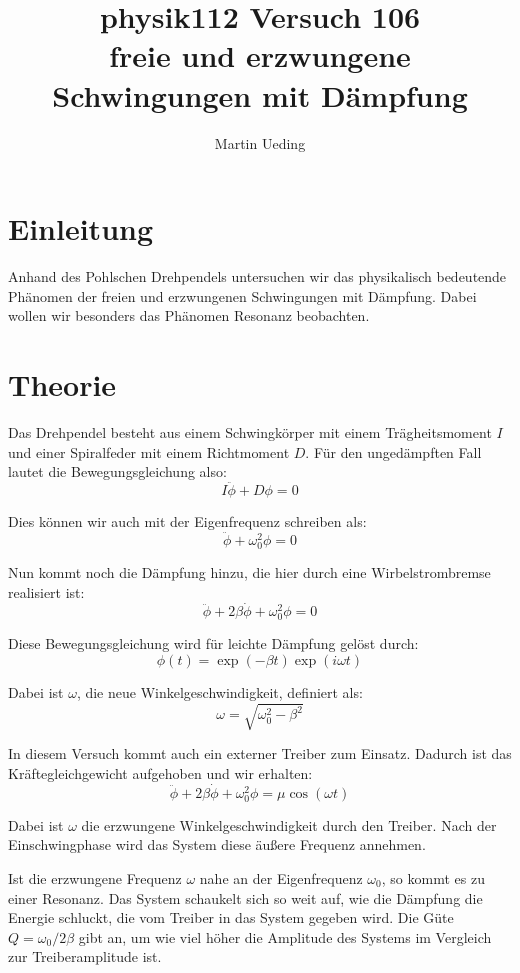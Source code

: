 \documentclass[11pt]{article}
\title{physik112 Versuch 106 \\ freie und erzwungene Schwingungen mit Dämpfung}
\author{Martin Ueding}
\begin{document}
\maketitle

\section{Einleitung}

Anhand des Pohlschen Drehpendels untersuchen wir das physikalisch bedeutende
Phänomen der freien und erzwungenen Schwingungen mit Dämpfung. Dabei wollen wir
besonders das Phänomen Resonanz beobachten.

\section{Theorie}

Das Drehpendel besteht aus einem Schwingkörper mit einem Trägheitsmoment $I$
und einer Spiralfeder mit einem Richtmoment $D$. Für den ungedämpften Fall
lautet die Bewegungsgleichung also:
\[ I \ddot{\phi} + D \phi = 0 \]

Dies können wir auch mit der Eigenfrequenz schreiben als:
\[ \ddot{\phi} + \omega_0^2 \phi = 0 \]

Nun kommt noch die Dämpfung hinzu, die hier durch eine Wirbelstrombremse
realisiert ist:
\[ \ddot{\phi} + 2 \beta \dot{\phi} + \omega_0^2 \phi = 0 \]

Diese Bewegungsgleichung wird für leichte Dämpfung gelöst durch:
\[ \phi(t) = \exp(-\beta t) \exp(i \omega t) \]

Dabei ist $\omega$, die neue Winkelgeschwindigkeit, definiert als:
\[ \omega = \sqrt{\omega_0^2 - \beta^2} \] 

In diesem Versuch kommt auch ein externer Treiber zum Einsatz. Dadurch ist das
Kräftegleichgewicht aufgehoben und wir erhalten:
\[ \ddot{\phi} + 2 \beta \dot{\phi} + \omega_0^2 \phi = \mu \cos(\omega t) \]

Dabei ist $\omega$ die erzwungene Winkelgeschwindigkeit durch den Treiber. Nach
der Einschwingphase wird das System diese äußere Frequenz annehmen.

Ist die erzwungene Frequenz $\omega$ nahe an der Eigenfrequenz $\omega_0$, so
kommt es zu einer Resonanz. Das System schaukelt sich so weit auf, wie die
Dämpfung die Energie schluckt, die vom Treiber in das System gegeben wird. Die
Güte $Q = \omega_0 / 2 \beta$ gibt an, um wie viel höher die Amplitude des
Systems im Vergleich zur Treiberamplitude ist.
\end{document}
